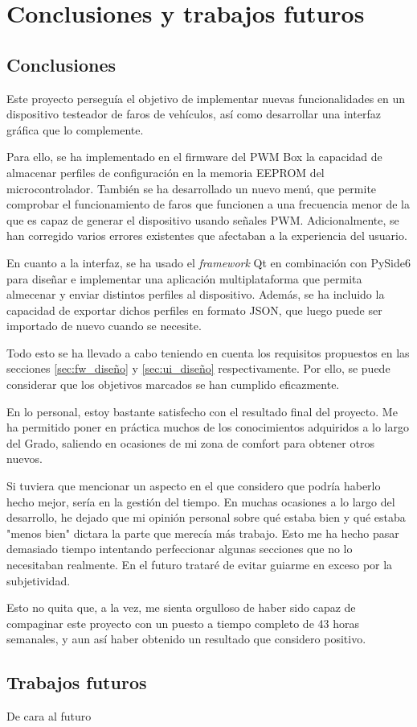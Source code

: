 \chapter{Conclusiones y trabajos futuros}

\section{Conclusiones}

Este proyecto perseguía el objetivo de implementar nuevas funcionalidades en un dispositivo testeador de faros de vehículos, así como desarrollar una interfaz gráfica que lo complemente.

Para ello, se ha implementado en el firmware del PWM Box la capacidad de almacenar perfiles de configuración en la memoria EEPROM del microcontrolador. También se ha desarrollado un nuevo menú, que permite comprobar el funcionamiento de faros que funcionen a una frecuencia menor de la que es capaz de generar el dispositivo usando señales PWM. Adicionalmente, se han corregido varios errores existentes que afectaban a la experiencia del usuario.

En cuanto a la interfaz, se ha usado el \textit{framework} Qt en combinación con PySide6 para diseñar e implementar una aplicación multiplataforma que permita almecenar y enviar distintos perfiles al dispositivo. Además, se ha incluido la capacidad de exportar dichos perfiles en formato JSON, que luego puede ser importado de nuevo cuando se necesite.

Todo esto se ha llevado a cabo teniendo en cuenta los requisitos propuestos en las secciones \ref{sec:fw_diseño} y \ref{sec:ui_diseño} respectivamente. Por ello, se puede considerar que los objetivos marcados se han cumplido eficazmente.

En lo personal, estoy bastante satisfecho con el resultado final del proyecto. Me ha permitido poner en práctica muchos de los conocimientos adquiridos a lo largo del Grado, saliendo en ocasiones de mi zona de comfort para obtener otros nuevos.

Si tuviera que mencionar un aspecto en el que considero que podría haberlo hecho mejor, sería en la gestión del tiempo. En muchas ocasiones a lo largo del desarrollo, he dejado que mi opinión personal sobre qué estaba bien y qué estaba "menos bien" dictara la parte que merecía más trabajo. Esto me ha hecho pasar demasiado tiempo intentando perfeccionar algunas secciones que no lo necesitaban realmente. En el futuro trataré de evitar guiarme en exceso por la subjetividad.

Esto no quita que, a la vez, me sienta orgulloso de haber sido capaz de compaginar este proyecto con un puesto a tiempo completo de 43 horas semanales, y aun así haber obtenido un resultado que considero positivo.

\section{Trabajos futuros}

De cara al futuro
